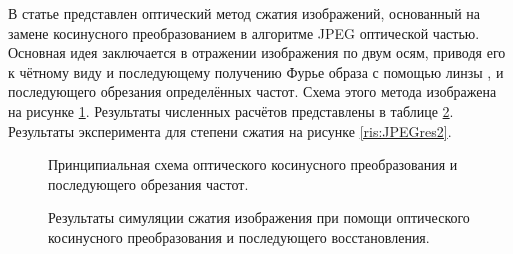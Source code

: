 \FloatBarrier\par
В статье \cite{alkholidi2007new} представлен оптический метод сжатия изображений, основанный на замене косинусного преобразованием в алгоритме JPEG оптической частью. Основная идея заключается в отражении изображения по двум осям, приводя его к чётному виду и последующему получению Фурье образа с помощью линзы \cite{goodman2005introduction}, и последующего обрезания определённых частот. Схема этого метода изображена на рисунке \ref{ris:JPEG}. Результаты численных расчётов представлены в таблице \ref{ris:JPEGres}. Результаты эксперимента для степени сжатия на рисунке \ref{ris:JPEGres2}.
\begin{figure}[h]
	\caption{Принципиальная схема оптического косинусного преобразования и последующего обрезания частот.}
	\label{ris:JPEG}
\end{figure}
\begin{figure}[h]
	\caption{Результаты симуляции сжатия изображения при помощи оптического косинусного преобразования и последующего восстановления.}
	\label{ris:JPEGres}
\end{figure}
